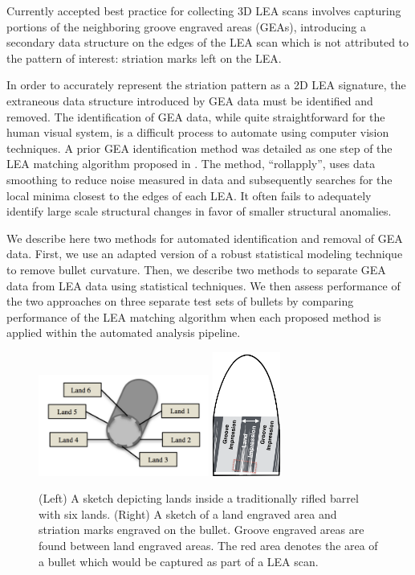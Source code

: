 \documentclass[12pt]{article}
\begin{document}
Currently accepted best practice for collecting 3D LEA scans involves
capturing portions of the neighboring groove engraved areas (GEAs),
introducing a secondary data structure on the edges of the LEA scan
which is not attributed to the pattern of interest: striation marks left
on the LEA.

In order to accurately represent the striation pattern as a 2D LEA
signature, the extraneous data structure introduced by GEA data must be
identified and removed. The identification of GEA data, while quite
straightforward for the human visual system, is a difficult process to
automate using computer vision techniques. A prior GEA identification
method was detailed as one step of the LEA matching algorithm proposed
in \citet{Hare1}. The method, ``rollapply'', uses data smoothing to
reduce noise measured in data and subsequently searches for the local
minima closest to the edges of each LEA. It often fails to adequately
identify large scale structural changes in favor of smaller structural
anomalies.

We describe here two methods for automated identification and removal of
GEA data. First, we use an adapted version of a robust statistical
modeling technique to remove bullet curvature. Then, we describe two
methods to separate GEA data from LEA data using statistical techniques.
We then assess performance of the two approaches on three separate test
sets of bullets by comparing performance of the \citet{Hare1} LEA
matching algorithm when each proposed method is applied within the
automated analysis pipeline.

\begin{figure}

\includegraphics[width=0.5\textwidth]{../images/scanning-stage0}
\hspace{3cm}
\includegraphics[width=0.2\textwidth]{../images/bullet-sketch}
\caption{(Left) A sketch depicting lands inside a traditionally rifled barrel with six lands. (Right) A sketch of a land engraved area and striation marks engraved on the bullet. Groove engraved areas are found between land engraved areas. The red area denotes the area of a bullet which would be captured as part of a LEA scan.}
\label{barrel-bullet}
\end{figure}
\end{document}

